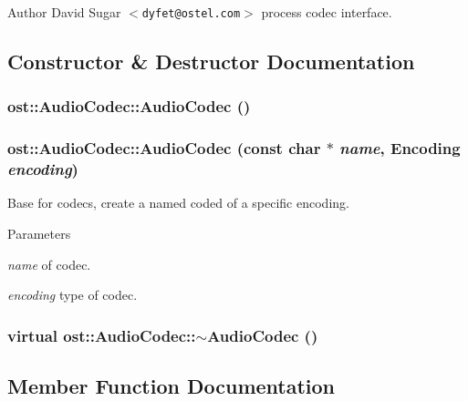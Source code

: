 \begin{DoxyAuthor}{Author}
David Sugar $<${\tt dyfet@ostel.com}$>$ process codec interface. 
\end{DoxyAuthor}


\subsection{Constructor \& Destructor Documentation}
\subsubsection[{AudioCodec}]{\setlength{\rightskip}{0pt plus 5cm}ost::AudioCodec::AudioCodec ()\hspace{0.3cm}{\ttfamily  [protected]}}\label{classost_1_1_audio_codec_ac2d7cd36a4aff2eec71dad02ac7eb67f}
\subsubsection[{AudioCodec}]{\setlength{\rightskip}{0pt plus 5cm}ost::AudioCodec::AudioCodec (const char $\ast$ {\em name}, \/  {\bf Encoding} {\em encoding})}\label{classost_1_1_audio_codec_ad6b39c6b8e48636490586ca614d48d84}


Base for codecs, create a named coded of a specific encoding. 
\begin{DoxyParams}{Parameters}
\item[{\em name}]of codec. \item[{\em encoding}]type of codec. \end{DoxyParams}
\subsubsection[{$\sim$AudioCodec}]{\setlength{\rightskip}{0pt plus 5cm}virtual ost::AudioCodec::$\sim$AudioCodec ()\hspace{0.3cm}{\ttfamily  [inline, virtual]}}\label{classost_1_1_audio_codec_a4149a63324548a0cd1a4c268d41fd6e4}


\subsection{Member Function Documentation}
